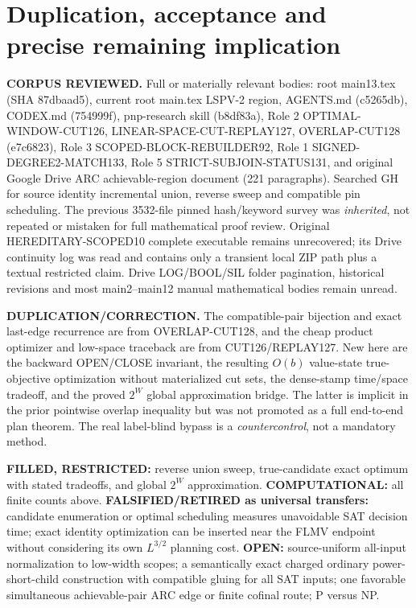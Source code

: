 \documentclass[11pt]{article}
\begin{document}
\section{Duplication, acceptance and precise remaining implication}
\textbf{CORPUS REVIEWED.} Full or materially relevant bodies: root main13.tex (SHA 87dbaad5), current root main.tex LSPV-2 region, AGENTS.md (c5265db), CODEX.md (754999f), pnp-research skill (b8df83a), Role 2 OPTIMAL-WINDOW-CUT126, LINEAR-SPACE-CUT-REPLAY127, OVERLAP-CUT128 (e7c6823), Role 3 SCOPED-BLOCK-REBUILDER92, Role 1 SIGNED-DEGREE2-MATCH133, Role 5 STRICT-SUBJOIN-STATUS131, and original Google Drive ARC achievable-region document (221 paragraphs). Searched GH for source identity incremental union, reverse sweep and compatible pin scheduling. The previous 3532-file pinned hash/keyword survey was \emph{inherited}, not repeated or mistaken for full mathematical proof review. Original HEREDITARY-SCOPED10 complete executable remains unrecovered; its Drive continuity log was read and contains only a transient local ZIP path plus a textual restricted claim. Drive LOG/BOOL/SIL folder pagination, historical revisions and most main2--main12 manual mathematical bodies remain unread.

\textbf{DUPLICATION/CORRECTION.} The compatible-pair bijection and exact last-edge recurrence are from OVERLAP-CUT128, and the cheap product optimizer and low-space traceback are from CUT126/REPLAY127. New here are the backward OPEN/CLOSE invariant, the resulting $O(b)$ value-state true-objective optimization without materialized cut sets, the dense-stamp time/space tradeoff, and the proved $2^W$ global approximation bridge. The latter is implicit in the prior pointwise overlap inequality but was not promoted as a full end-to-end plan theorem. The real label-blind bypass is a \emph{countercontrol}, not a mandatory method.

\textbf{FILLED, RESTRICTED:} reverse union sweep, true-candidate exact optimum with stated tradeoffs, and global $2^W$ approximation. \textbf{COMPUTATIONAL:} all finite counts above. \textbf{FALSIFIED/RETIRED as universal transfers:} candidate enumeration or optimal scheduling measures unavoidable SAT decision time; exact identity optimization can be inserted near the FLMV endpoint without considering its own $L^{3/2}$ planning cost. \textbf{OPEN:} source-uniform all-input normalization to low-width scopes; a semantically exact charged ordinary power-short-child construction with compatible gluing for all SAT inputs; one favorable simultaneous achievable-pair ARC edge or finite cofinal route; P versus NP.
\end{document}
